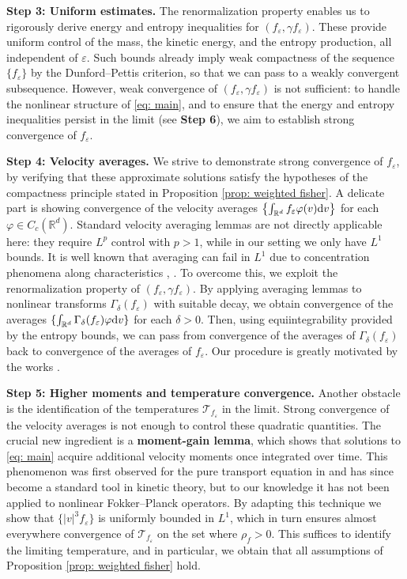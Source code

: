 \documentclass[10pt, reqno]{amsart}
\theoremstyle{plain}
\theoremstyle{definition}
\theoremstyle{remark}
\numberwithin{equation}{section}
\newcommand{\calT}{\mathcal T}
\newcommand{\R}{\mathbb{R}}
\newcommand{\ve}{\varepsilon}
\newcommand{\dv}{\textnormal{d}v}
\newcommand{\lt}{\left}
\newcommand{\rt}{\right}
\newcommand{\intr}{\int_{\R^d}}
\begin{document}
\medskip

\noindent
\textbf{Step 3: Uniform estimates.}
The renormalization property enables us to rigorously derive energy and entropy inequalities for $(f_\ve,\gamma f_\ve)$. These provide uniform control of the mass, the kinetic energy, and the entropy production, all independent of $\ve$. Such bounds already imply weak compactness of the sequence $\{f_\ve\}$ by the Dunford--Pettis criterion, so that we can pass to a weakly convergent subsequence. However, weak convergence of $(f_\ve,\gamma f_\ve)$ is not sufficient: to handle the nonlinear structure of \eqref{eq: main}, and to ensure that the energy and entropy inequalities persist in the limit (see \textbf{Step 6}), we aim to establish strong convergence of $f_\ve$. 
\medskip

\noindent
\textbf{Step 4: Velocity averages.}
We strive to demonstrate strong convergence of $f_\ve$, by verifying that these approximate solutions satisfy the hypotheses of the compactness principle stated in Proposition \ref{prop: weighted fisher}. A delicate part is showing convergence of the velocity averages $\lt\{\intr f_\ve \varphi(v) \dv\rt\}$ for each $\varphi\in C_c(\R^d)$. Standard velocity averaging lemmas are not directly applicable here: they require $L^p$ control with $p>1$, while in our setting we only have $L^1$ bounds. It is well known that averaging can fail in $L^1$ due to concentration phenomena along characteristics \cite[p. 123]{GLPS88}, \cite[p. 558]{GS02}. To overcome this, we exploit the renormalization property of $(f_\ve, \gamma f_\ve)$. By applying averaging lemmas to nonlinear transforms $\Gamma_\delta(f_\ve)$ with suitable decay, we obtain convergence of the averages $\{\int_{\R^d} \Gamma_\delta(f_\ve)\varphi\dv\}$ for each $\delta>0$. Then, using equiintegrability provided by the entropy bounds, we can pass from convergence of the averages of $\Gamma_\delta(f_\ve)$ back to convergence of the averages of $f_\ve$. Our procedure is greatly motivated by the works \cite{dipernalionsMaxwell1989, GolseSaintRaymond05}.

\medskip

\noindent
\textbf{Step 5: Higher moments and temperature convergence.}
Another obstacle is the identification of the temperatures $\calT_{f_\ve}$ in the limit. Strong convergence of the velocity averages is not enough to control these quadratic quantities. The crucial new ingredient is a \textbf{moment-gain lemma}, which shows that solutions to \eqref{eq: main} acquire additional velocity moments once integrated over time. This phenomenon was first observed for the pure transport equation in \cite{Perthame1992} and has since become a standard tool in kinetic theory, but to our knowledge it has not been applied to nonlinear Fokker--Planck operators. By adapting this technique we show that $\{|v|^3 f_\ve\}$ is uniformly bounded in $L^1$, which in turn ensures almost everywhere convergence of $\calT_{f_\ve}$ on the set where $\rho_f>0$. This suffices to identify the limiting temperature, and in particular, we obtain that all assumptions of Proposition \ref{prop: weighted fisher} hold.
\end{document}
